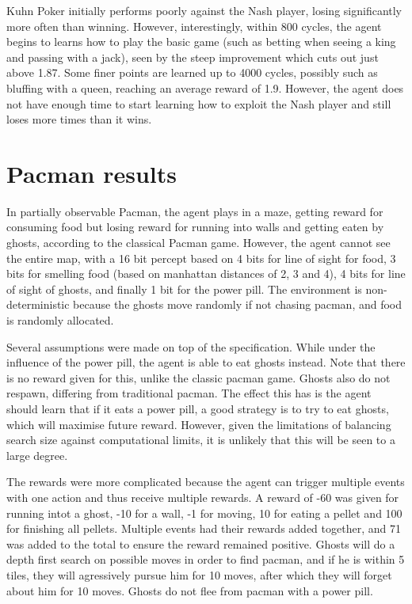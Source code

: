 \documentclass[pdftex,twoside,a4paper]{report}
\begin{document}
Kuhn Poker initially performs poorly against the Nash player, losing significantly more often than winning. However, interestingly, within 800 cycles, the agent begins to learns how to play the basic game (such as betting when seeing a king and passing with a jack), seen by the steep improvement which cuts out just above 1.87. Some finer points are learned up to 4000 cycles, possibly such as bluffing with a queen, reaching an average reward of 1.9. However, the agent does not have enough time to start learning how to exploit the Nash player and still loses more times than it wins.

\section{Pacman results}

In partially observable Pacman, the agent plays in a maze, getting reward for consuming food but losing reward for running into walls and getting eaten by ghosts, according to the classical Pacman game. However, the agent cannot see the entire map, with a 16 bit percept based on 4 bits for line of sight for food, 3  bits for smelling food (based on manhattan distances of 2, 3 and 4), 4 bits for line of sight of ghosts, and finally 1 bit for the power pill. The environment is non-deterministic because the ghosts move randomly if not chasing pacman, and food is randomly allocated.

Several assumptions were made on top of the specification.  While under the influence of the power pill, the agent is able to eat ghosts instead. Note that there is no reward given for this, unlike the classic pacman game. Ghosts also do not respawn, differing from traditional pacman. The effect this has is the agent should learn that if it eats a power pill, a good strategy is to try to eat ghosts, which will maximise future reward. However, given the limitations of balancing search size against computational limits, it is unlikely that this will be seen to a large degree.

The rewards were more complicated because the agent can trigger multiple events with one action and thus receive multiple rewards. A reward of -60 was given for running intot a ghost, -10 for a wall, -1 for moving, 10 for eating a pellet and 100 for finishing all pellets. Multiple events had their rewards added together, and 71 was added to the total to ensure the reward remained positive. Ghosts will do a depth first search on possible moves in order to find pacman, and if he is within 5 tiles, they will agressively pursue him for 10 moves, after which they will forget about him for 10 moves. Ghosts do not flee from pacman with a power pill.
\end{document}
